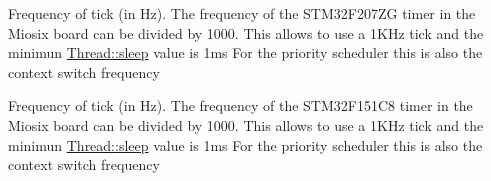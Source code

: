 Frequency of tick (in Hz). The frequency of the S\-T\-M32\-F207\-Z\-G timer in the Miosix board can be divided by 1000. This allows to use a 1\-K\-Hz tick and the minimun \hyperlink{classmiosix_1_1_thread_ad7f738dc69a918960fe814a062696c5c}{Thread\-::sleep} value is 1ms For the priority scheduler this is also the context switch frequency

Frequency of tick (in Hz). The frequency of the S\-T\-M32\-F151\-C8 timer in the Miosix board can be divided by 1000. This allows to use a 1\-K\-Hz tick and the minimun \hyperlink{classmiosix_1_1_thread_ad7f738dc69a918960fe814a062696c5c}{Thread\-::sleep} value is 1ms For the priority scheduler this is also the context switch frequency 